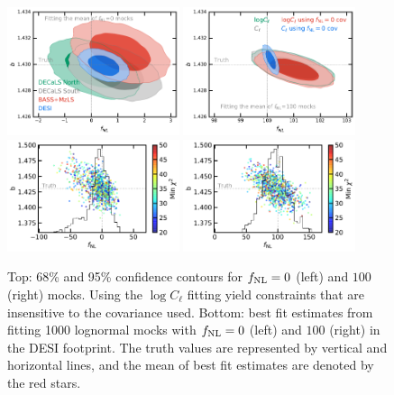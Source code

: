 \begin{figure}
    \centering
    \includegraphics[width=0.45\textwidth]{figures/mcmc_zero.pdf} 
    \includegraphics[width=0.45\textwidth]{figures/mcmc_po100.pdf} 
    \includegraphics[width=0.45\textwidth]{figures/bestfit_zero.pdf} 
    \includegraphics[width=0.45\textwidth]{figures/bestfit_po100.pdf}         
    \caption{Top: 68\% and 95\% confidence contours for $f_{\rm NL}=0$ (left) and $100$ (right) mocks. Using the $\log C_{\ell}$ fitting yield constraints that are insensitive to the covariance used. Bottom: best fit estimates from fitting 1000 lognormal mocks with $f_{\rm NL}=0$ (left) and $100$ (right) in the DESI footprint. The truth values are represented by vertical and horizontal lines, and the mean of best fit estimates are denoted by the red stars.}\label{fig:mcmc_mocks}
\end{figure}



